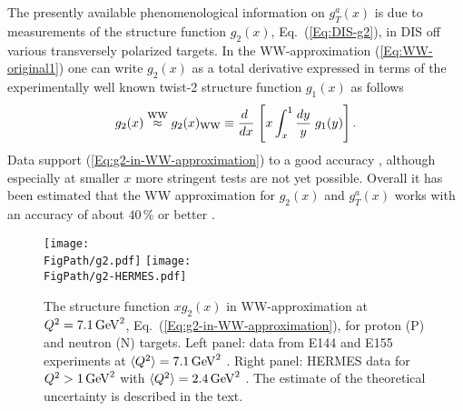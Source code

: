 \documentclass[a4paper,11pt]{article}
\newcommand{\blue}[1]{{\color{blue} #1}}
\newcommand{\be}{\begin{equation}}
\newcommand{\ee}{\end{equation}}
\newcommand{\la}{\langle}
\newcommand{\ra}{\rangle}
\newcommand{\ps}[1]{\blue{ #1}}
\newcommand*{\FigPath}{./figs}%
\begin{document}
The presently available phenomenological information on $g_T^a(x)$ is due 
to measurements of the structure function $g_2(x)$, Eq.~(\ref{Eq:DIS-g2}),
in DIS off various transversely polarized targets. In the WW-approximation 
(\ref{Eq:WW-original1}) one can write $g_2(x)$ as a total derivative
expressed in terms of the experimentally well known twist-2
structure function $g_1(x)$ as follows
\be
    	g_2(x) \stackrel{\rm WW}{\approx} g_2(x)_{\rm WW} \equiv
	\frac{ d\;}{ d x}\;\Biggl[x\int_x^1\frac{ d y}{y}
	\;g_1(y)\Biggr]\,.\label{Eq:g2-in-WW-approximation}
\ee
Data support (\ref{Eq:g2-in-WW-approximation}) to a good accuracy
\cite{Anthony:2002hy,Abe:1998wq,Airapetian:2011wu}, although especially 
at smaller $x$ more stringent tests are not yet possible. Overall it has 
been estimated that the WW approximation for $g_2(x)$ and $g_T^a(x)$ works 
with an accuracy of about $40\,\%$ or better \cite{Accardi:2009au}. 

\begin{figure}[t!]
\centering
\texttt{[image: \\FigPath/g2.pdf]} 
\texttt{[image: \\FigPath/g2-HERMES.pdf]} 
\caption{\label{Fig:g2} 
The structure function $xg_2(x)$ in WW-approximation at $Q^2=7.1\,{\rm GeV}^2$,
Eq.~(\ref{Eq:g2-in-WW-approximation}), for proton (P) and neutron (N) targets. 
Left panel: data from E144 and E155 experiments at 
$\la Q^2\ra=7.1\,{\rm GeV}^2$ \cite{Anthony:2002hy,Abe:1998wq}. 
Right panel: HERMES data \ps{for $Q^2>1\,{\rm GeV}^2$ with}
$\la Q^2\ra=2.4\,{\rm GeV}^2$ \cite{Airapetian:2011wu}.
The estimate of the theoretical uncertainty is described in the text.}
\end{figure}
\end{document}
